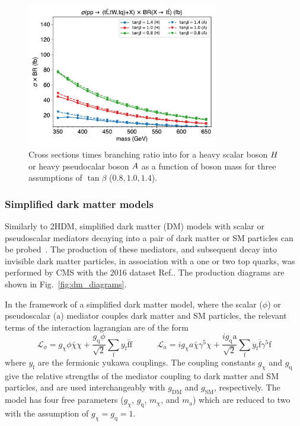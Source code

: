 \begin{figure}[htb!]
    \centering
    \includegraphics[width=0.75\textwidth]{figs/ftan/plot_1d_2hdm_xsec}
\caption{Cross sections times branching ratio into \ttbar for a heavy scalar boson $H$ 
or heavy pseudocalar boson $A$ as a function of boson mass for three assumptions of 
$\tan\beta$ ($0.8, 1.0, 1.4$).}
\label{fig:thdm_1d_xsec}
\end{figure}

\FloatBarrier

\subsubsection{Simplified dark matter models}

Similarly to 2HDM, simplified dark matter (DM) models with scalar or pseudoscalar
mediators decaying into a pair of dark matter or SM particles can be
probed~\cite{THEORY:DMsingletop}. The production of these mediators,
and subsequent decay into invisible dark matter particles,
in association with a one or two top
quarks, was performed by CMS with the 2016 dataset
Ref.\cite{CMS:DMsingletop,CMS:DMttpair}. The production diagrams are shown in
Fig.~\ref{fig:dm_diagrams}.

In the framework of a simplified dark matter model, where the scalar ($\phi$)
or pseudoscalar ($\mathrm{a}$) mediator couples dark matter and SM particles,
the relevant terms of the interaction lagrangian are of the form
\[
    \mathcal{L}_{\phi}=g_{\chi}\phi\bar{\chi}\chi + \frac{g_\mathrm{q} \phi}{\sqrt{2}} \sum_{\mathrm{f}} y_\mathrm{f} \bar{\mathrm{f}} \mathrm{f}
    \quad\quad\quad
    \mathcal{L}_{a}=i g_{\chi}a\bar{\chi}\gamma^5\chi + \frac{i g_\mathrm{q} \mathrm{a}}{\sqrt{2}} \sum_{\mathrm{f}} y_\mathrm{f} \bar{\mathrm{f}} \gamma^5 \mathrm{f}
\]
where $y_\mathrm{f}$ are the fermionic yukawa couplings. The coupling
constants $g_\chi$ and $g_\mathrm{q}$ give the relative strengths of the
mediator coupling to dark matter and SM particles, and are used
interchangeably with $g_\mathrm{DM}$ and $g_\mathrm{SM}$, respectively. The
model has four free parameters ($g_\chi$, $g_\mathrm{q}$, $m_\chi$, and
$m_\mathrm{a}$) which are reduced to two with the assumption of $g_\chi =
g_\mathrm{q} = 1$.

